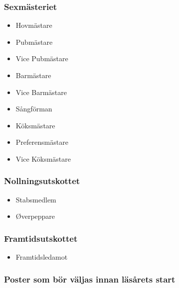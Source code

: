 \documentclass{dsekprotokoll}
\begin{document}
\begin{multicols}{2}
    \subsubsection*{Sexmästeriet}
    \begin{itemize}
        \item Hovmästare
        \item Pubmästare
        \item Vice Pubmästare
        \item Barmästare
        \item Vice Barmästare
        \item Sångförman
        \item Köksmästare
        \item Preferensmästare
        \item Vice Köksmästare
    \end{itemize}

    \subsubsection*{Nollningsutskottet}
    \begin{itemize}
        \item Stabsmedlem
        \item Øverpeppare
    \end{itemize}

    \subsubsection*{Framtidsutskottet}
    \begin{itemize}
        \item Framtidsledamot
    \end{itemize}
\end{multicols}

\subsubsection*{Poster som bör väljas innan läsårets start}
\end{document}
